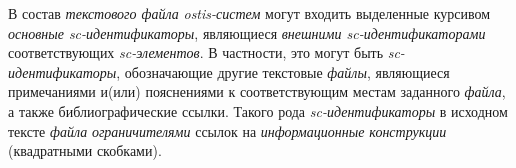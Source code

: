 В состав \textit{текстового файла} \textit{ostis-систем} могут входить выделенные курсивом \textit{основные sc-идентификаторы}, являющиеся \textit{внешними sc-идентификаторами} соответствующих \textit{sc-элементов}.
В частности, это могут быть \textit{sc-идентификаторы}, обозначающие другие текстовые \textit{файлы}, являющиеся примечаниями и(или) пояснениями к соответствующим местам заданного \textit{файла}, а также библиографические ссылки.
Такого рода \textit{sc-идентификаторы} в исходном тексте \textit{файла} \textit{ограничителями} ссылок на \textit{информационные конструкции} (квадратными скобками).

\begin{SCn}

        \begin{scnindent}
        \end{scnindent}

\end{SCn}

%